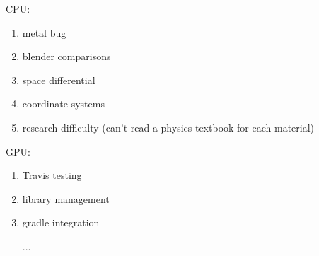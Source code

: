 CPU:
\begin{enumerate}
  \item metal bug
  \item blender comparisons
  \item space differential
  \item coordinate systems
  \item research difficulty (can't read a physics textbook for each material)
\end{enumerate}

GPU:
\begin{enumerate}
  \item Travis testing
  \item library management
  \item gradle integration
  \item [...]
\end{enumerate}
